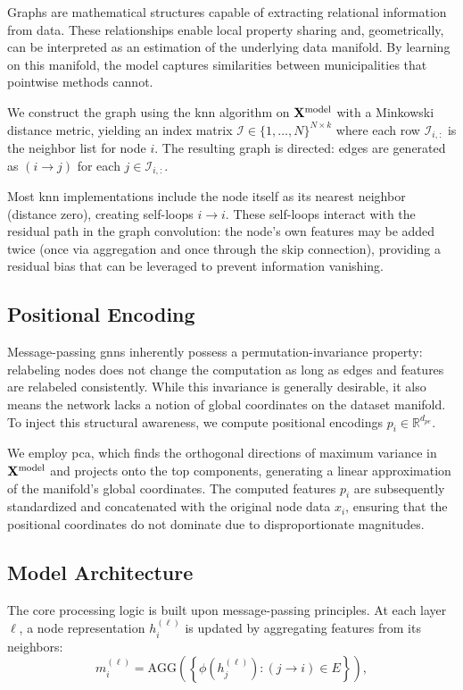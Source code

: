 \documentclass[english]{sbrt}
\begin{document}
Graphs are mathematical structures capable of extracting relational information from data. These relationships enable local property sharing and, geometrically, can be interpreted as an estimation of the underlying data manifold. By learning on this manifold, the model captures similarities between municipalities that pointwise methods cannot.

We construct the graph using the \gls{knn} algorithm on $\mathbf{X}^\mathrm{model}$ with a Minkowski distance metric, yielding an index matrix $\mathcal{I} \in \{1,\ldots,N\}^{N \times k}$ where each row $\mathcal{I}_{i,:}$ is the neighbor list for node $i$. The resulting graph is directed: edges are generated as $(i \rightarrow j)$ for each $j \in \mathcal{I}_{i,:}$.

Most \gls{knn} implementations include the node itself as its nearest neighbor (distance zero), creating self-loops $i \rightarrow i$. These self-loops interact with the residual path in the graph convolution: the node's own features may be added twice (once via aggregation and once through the skip connection), providing a residual bias that can be leveraged to prevent information vanishing.

\subsection{Positional Encoding}

Message-passing \gls{gnn}s inherently possess a permutation-invariance property: relabeling nodes does not change the computation as long as edges and features are relabeled consistently. While this invariance is generally desirable, it also means the network lacks a notion of global coordinates on the dataset manifold. To inject this structural awareness, we compute positional encodings $p_i \in \mathbb{R}^{d_{pe}}$.

We employ \gls{pca}, which finds the orthogonal directions of maximum variance in $\mathbf{X}^\mathrm{model}$ and projects onto the top components, generating a linear approximation of the manifold's global coordinates. The computed features $p_i$ are subsequently standardized and concatenated with the original node data $x_i$, ensuring that the positional coordinates do not dominate due to disproportionate magnitudes.

\subsection{Model Architecture}

The core processing logic is built upon message-passing principles. At each layer $\ell$, a node representation $h_i^{(\ell)}$ is updated by aggregating features from its neighbors:
\begin{equation}
    m_i^{(\ell)} = \mathrm{AGG}\left(\left\{\phi\left(h_j^{(\ell)}\right):(j\rightarrow i) \in E\right\}\right),
\end{equation}
\end{document}
